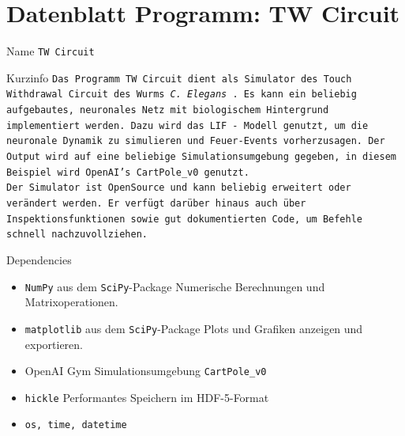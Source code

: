 \chapter{Datenblatt Programm: TW Circuit}
%
\label{app:datenblatt}
\enlargethispage{2\baselineskip}
\begin{minipage}[b]{0.61\textwidth}
	\begin{mybox}{Name}
		\texttt{TW Circuit}
	\end{mybox}
	\begin{mybox}{Kurzinfo}
		\texttt{Das Programm TW Circuit dient als Simulator des Touch Withdrawal Circuit des Wurms \textit{C. Elegans} \cite{WormLevelRL}. Es kann ein beliebig aufgebautes, neuronales Netz mit biologischem Hintergrund implementiert werden. Dazu wird das LIF - Modell genutzt, um die neuronale Dynamik zu simulieren und Feuer-Events vorherzusagen. Der Output wird auf eine beliebige Simulationsumgebung gegeben, in diesem Beispiel wird OpenAI's CartPole\_v0 genutzt.\\ Der Simulator ist OpenSource und kann beliebig erweitert oder verändert werden. Er verfügt darüber hinaus auch über Inspektionsfunktionen sowie gut dokumentierten Code, um Befehle schnell nachzuvollziehen.}
	\end{mybox}
	\begin{mybox}{Dependencies}
		\begin{itemize}
			\item \texttt{NumPy} aus dem \texttt{SciPy}-Package
			\subitem Numerische Berechnungen und Matrixoperationen.
			\item \texttt{matplotlib} aus dem \texttt{SciPy}-Package
			\subitem Plots und Grafiken anzeigen und exportieren.
			\item OpenAI Gym
			\subitem Simulationsumgebung \texttt{CartPole\_v0}
			\item \texttt{hickle}
			\subitem Performantes Speichern im HDF-5-Format
			\item \texttt{os, time, datetime}
		\end{itemize}
	\end{mybox}
\end{minipage}
